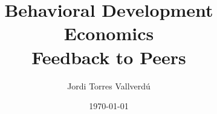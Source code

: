 \documentclass[12pt]{article}
\title{Behavioral Development Economics\\Feedback to Peers}
\author{Jordi Torres Vallverdú}
\date{\today}
\begin{document}
\maketitle

\section*{}
\end{document}
